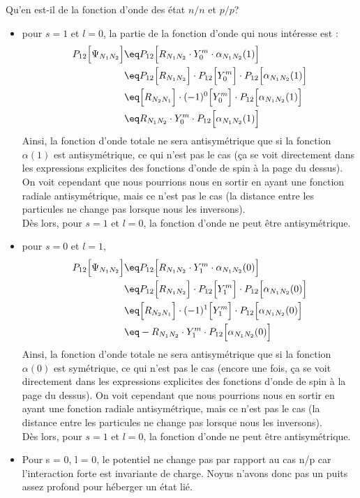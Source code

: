 Qu'en est-il de la fonction d'onde des état $n/n$ et $p/p$?
\begin{itemize}[label=$\bullet$]
    \item pour $s=1$ et $l=0$, la partie de la fonction d'onde qui nous intéresse est :
    \begin{align*}
        P_{12} \Big[ \Psi_{N_1N_2} \Big] &\eq
        P_{12} \Big[ R_{N_1N_2} \cdot Y_0^m \cdot \alpha_{N_1N_2}(1)  \Big] \\
        &\eq
        P_{12} \Big[ R_{N_1N_2} \Big]\cdot P_{12} \Big[Y_0^m \Big]\cdot P_{12} \Big[\alpha_{N_1N_2}(1)  \Big]\\
        &\eq
        \Big[ R_{N_2N_1} \Big]\cdot (-1)^0\Big[Y_0^m \Big]\cdot P_{12} \Big[\alpha_{N_1N_2}(1)  \Big]\\
        &\eq
        R_{N_1N_2} \cdot Y_0^m \cdot P_{12} \Big[\alpha_{N_1N_2}(1)  \Big]
    \end{align*}
    Ainsi, la fonction d'onde totale ne sera antisymétrique que si la fonction $\alpha(1)$ est antisymétrique, ce qui n'est pas le cas (ça se voit directement dans les expressions explicites des fonctions d'onde de spin à la page du dessus). On voit cependant que nous pourrions nous en sortir en ayant une fonction radiale antisymétrique, mais ce n'est pas le cas (la distance entre les particules ne change pas lorsque nous les inversons).\\
    Dès lors, pour $s=1$ et $l=0$, la fonction d'onde ne peut être antisymétrique.\\[4pt]
    
    \item pour $s=0$ et $l=1$, 
    \begin{align*}
        P_{12} \Big[ \Psi_{N_1N_2} \Big] &\eq
        P_{12} \Big[ R_{N_1N_2} \cdot Y_1^m \cdot \alpha_{N_1N_2}(0)  \Big] \\
        &\eq
        P_{12} \Big[ R_{N_1N_2} \Big]\cdot P_{12} \Big[Y_1^m \Big]\cdot P_{12} \Big[\alpha_{N_1N_2}(0)  \Big]\\
        &\eq
        \Big[ R_{N_2N_1} \Big]\cdot (-1)^1\Big[Y_1^m \Big]\cdot P_{12} \Big[\alpha_{N_1N_2}(0)  \Big]\\
        &\eq
        - R_{N_1N_2} \cdot Y_1^m \cdot P_{12} \Big[\alpha_{N_1N_2}(0)  \Big]
    \end{align*}
    Ainsi, la fonction d'onde totale ne sera antisymétrique que si la fonction $\alpha(0)$ est symétrique, ce qui n'est pas le cas (encore une fois, ça se voit directement dans les expressions explicites des fonctions d'onde de spin à la page du dessus). On voit cependant que nous pourrions nous en sortir en ayant une fonction radiale antisymétrique, mais ce n'est pas le cas (la distance entre les particules ne change pas lorsque nous les inversons).\\
    Dès lors, pour $s=1$ et $l=0$, la fonction d'onde ne peut être antisymétrique.\\[4pt]
    \item Pour s = 0, l = 0, le potentiel ne change pas par rapport au cas n/p car l'interaction forte est invariante de charge. Noyus n'avons donc pas un puits assez profond pour héberger un état lié.
\end{itemize}

